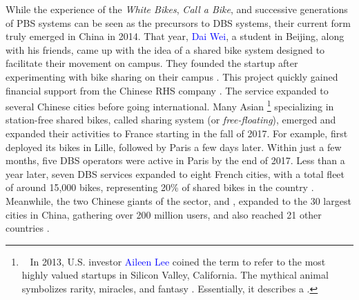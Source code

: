 \begin{refsegment}
While the experience of the \textsl{White Bikes}, \textsl{Call a Bike}, and successive generations of \acrshort{PBS} systems can be seen as the precursors to \acrshort{DBS} systems, their current form truly emerged in China in 2014. That year, \textcolor{blue}{Dai Wei}, a student in Beijing, along with his friends, came up with the idea of a shared bike system designed to facilitate their movement on campus. They founded the startup  after experimenting with bike sharing on their campus \textcolor{blue}{\autocite[10]{nlc_micromobility_2019}}. This project quickly gained financial support from the Chinese \acrshort{RHS} company  \textcolor{blue}{\autocite[18]{6t-bureau_de_recherche_etude_2018}}. The service expanded to several Chinese cities before going international. Many Asian \footnote{~
    In 2013, U.S. investor \textcolor{blue}{Aileen Lee} coined the term  to refer to the most highly valued startups in Silicon Valley, California. The mythical animal symbolizes rarity, miracles, and fantasy \textcolor{blue}{\autocite{benner_unicorn_2015}}. Essentially, it describes a  \textcolor{blue}{\autocite{chambre_de_commerce_et_dindustrie_licornes_2019}}.
} specializing in station-free shared bikes, called  sharing system (or \textsl{free-floating}), emerged and expanded their activities to France starting in the fall of 2017. For example,  first deployed its bikes in Lille, followed by Paris a few days later. Within just a few months, five \acrshort{DBS} operators were active in Paris by the end of 2017. Less than a year later, seven \acrshort{DBS} services expanded to eight French cities, with a total fleet of around 15,000 bikes, representing 20\% of shared bikes in the country \textcolor{blue}{\autocite[23]{6t-bureau_de_recherche_etude_2018}}. Meanwhile, the two Chinese giants of the sector,  and , expanded to the 30 largest cities in China, gathering over 200 million users, and also reached 21 other countries \textcolor{blue}{\autocite[22, 91]{kang_university_2020}}.%


\end{refsegment}
